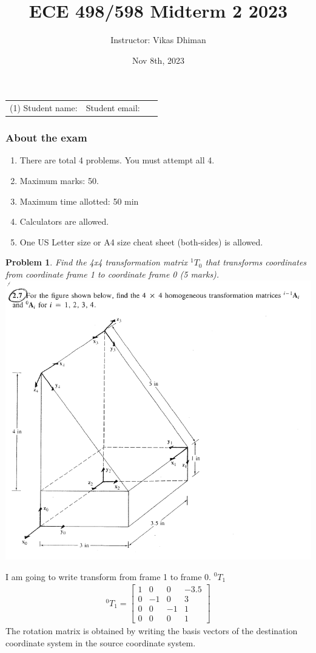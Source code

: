 \documentclass{article}
\title{ECE 498/598 Midterm 2 2023}
\date{Nov 8th, 2023}
\author{Instructor: Vikas Dhiman}
\newtheorem{prob}{Problem}
\begin{document}
\maketitle

\begin{tabular}{p{0.5\linewidth}p{0.5\linewidth}}
  (1) Student name:& Student email: \\
\end{tabular}

\subsubsection*{About the exam}
\begin{enumerate}
  \item There are total 4 problems. You must attempt all 4.
  \item Maximum marks: 50.
  \item Maximum time allotted:  50 min
  \item Calculators are allowed.
  \item One US Letter size or A4 size cheat sheet (both-sides) is allowed.
\end{enumerate}

\begin{prob}
  Find the 4x4 transformation matrix $^1T_0$ that transforms coordinates from coordinate frame 1 to coordinate frame 0 (5 marks).\\
  \includegraphics[width=0.7\linewidth,trim=0 0 0 1in,clip]{./media/transformations.png}
\end{prob}
I am going to write transform from frame 1 to frame 0. $^0T_1$
\begin{align}
  ^0T_1 = \begin{bmatrix}
    1 & 0 & 0 & -3.5\\
    0 & -1 & 0 & 3 \\
    0 & 0 & -1 & 1\\
    0 & 0 & 0 & 1
  \end{bmatrix}
\end{align}
The rotation matrix is obtained by writing the basis vectors of the destination coordinate system in the source coordinate system.
\end{document}
